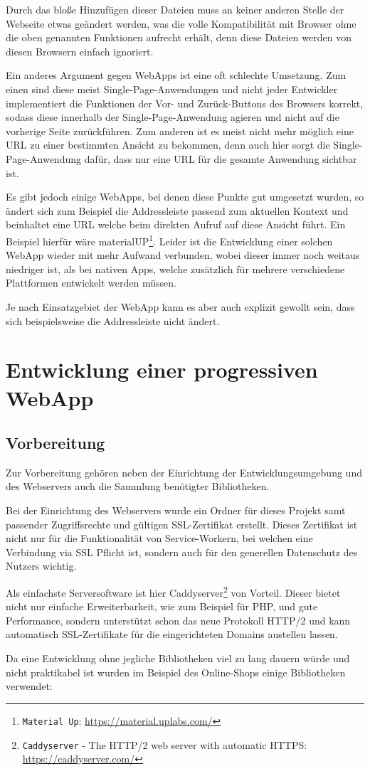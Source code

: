 \documentclass[a4paper,12pt,ngerman,listof=numbered]{scrartcl}      %
\providecommand{\inlinecode}[1]{\texttt{#1}}
\begin{document}
	Durch das bloße Hinzufügen dieser Dateien muss an keiner anderen Stelle der Webseite etwas geändert werden, was die volle Kompatibilität mit Browser ohne die oben genannten Funktionen aufrecht erhält, denn diese Dateien werden von diesen Browsern einfach ignoriert.\par
	Ein anderes Argument gegen WebApps ist eine oft schlechte Umsetzung. Zum einen sind diese meist Single-Page-Anwendungen und nicht jeder Entwickler implementiert die Funktionen der Vor- und Zurück-Buttons des Browsers korrekt, sodass diese innerhalb der Single-Page-Anwendung agieren und nicht auf die vorherige Seite zurückführen. Zum anderen ist es meist nicht mehr möglich eine URL zu einer bestimmten Ansicht zu bekommen, denn auch hier sorgt die Single-Page-Anwendung dafür, dass nur eine URL für die gesamte Anwendung sichtbar ist.\par
	Es gibt jedoch einige WebApps, bei denen diese Punkte gut umgesetzt wurden, so ändert sich zum Beispiel die Addressleiste passend zum aktuellen Kontext und beinhaltet eine URL welche beim direkten Aufruf auf diese Ansicht führt. Ein Beispiel hierfür wäre materialUP\footnote{\inlinecode{Material Up}: \url{https://material.uplabs.com/}}. Leider ist die Entwicklung einer solchen WebApp wieder mit mehr Aufwand verbunden, wobei dieser immer noch weitaus niedriger ist, als bei nativen Apps, welche zusätzlich für mehrere verschiedene Plattformen entwickelt werden müssen.\par
	Je nach Einsatzgebiet der WebApp kann es aber auch explizit gewollt sein, dass sich beispielsweise die Addressleiste nicht ändert.\par
	
	\newpage
	\section{Entwicklung einer progressiven WebApp}
	\subsection{Vorbereitung}
	Zur Vorbereitung gehören neben der Einrichtung der Entwicklungsumgebung und des Webservers auch die Sammlung benötigter Bibliotheken.\par
	Bei der Einrichtung des Webservers wurde ein Ordner für dieses Projekt samt passender Zugriffsrechte und gültigen SSL-Zertifikat erstellt. Dieses Zertifikat ist nicht nur für die Funktionalität von Service-Workern, bei welchen eine Verbindung via SSL Pflicht ist, sondern auch für den generellen Datenschutz des Nutzers wichtig.\par
	Als einfachste Serversoftware ist hier Caddyserver\footnote{\inlinecode{Caddyserver} - The HTTP/2 web server with automatic HTTPS: \url{https://caddyserver.com/}} von Vorteil. Dieser bietet nicht nur einfache Erweiterbarkeit, wie zum Beispiel für PHP, und gute Performance, sondern unterstützt schon das neue Protokoll HTTP/2 und kann automatisch SSL-Zertifikate für die eingerichteten Domains austellen lassen.\par
	Da eine Entwicklung ohne jegliche Bibliotheken viel zu lang dauern würde und nicht praktikabel ist wurden im Beispiel des Online-Shops einige Bibliotheken verwendet:\par
	
\end{document}
